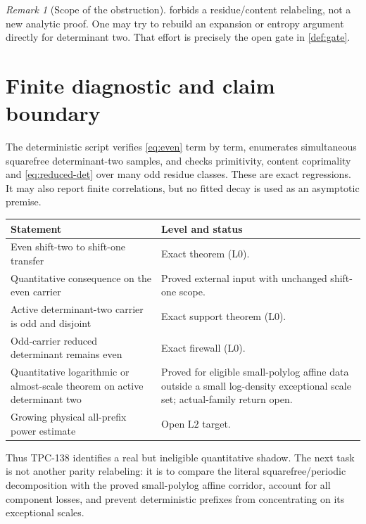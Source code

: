 \documentclass[11pt]{article}
\theoremstyle{definition}
\theoremstyle{remark}
\newtheorem{remark}[theorem]{Remark}
\newcommand{\Lzero}{\mathrm{L0}}
\newcommand{\Ltwo}{\mathrm{L2}}
\begin{document}
\begin{remark}[Scope of the obstruction]
 forbids a residue/content relabeling, not a new
analytic proof.  One may try to rebuild an expansion or entropy
argument directly for determinant two.  That effort is precisely
the open gate in \cref{def:gate}.
\end{remark}

\section{Finite diagnostic and claim boundary}

The deterministic script verifies \eqref{eq:even} term by term,
enumerates simultaneous squarefree determinant-two samples, and
checks primitivity, content coprimality and
\eqref{eq:reduced-det} over many odd residue classes.  These are
exact regressions.  It may also report finite correlations, but no
fitted decay is used as an asymptotic premise.

\begin{center}
\small
\begin{tabularx}{\textwidth}{@{}p{}X@{}}
\toprule
Statement & Level and status\\
\midrule
Even shift-two to shift-one transfer
& Exact theorem (\(\Lzero\)).\\
Quantitative consequence on the even carrier
& Proved external input with unchanged shift-one scope.\\
Active determinant-two carrier is odd and disjoint
& Exact support theorem (\(\Lzero\)).\\
Odd-carrier reduced determinant remains even
& Exact firewall (\(\Lzero\)).\\
Quantitative logarithmic or almost-scale theorem on active
determinant two
& Proved for eligible small-polylog affine data outside a
small log-density exceptional scale set; actual-family return
open.\\
Growing physical all-prefix power estimate
& Open \(\Ltwo\) target.\\
\bottomrule
\end{tabularx}
\end{center}

Thus TPC-138 identifies a real but ineligible quantitative shadow.
The next task is not another parity relabeling: it is to compare the
literal squarefree/periodic decomposition with the proved
small-polylog affine corridor, account for all component losses,
and prevent deterministic prefixes from concentrating on its
exceptional scales.

\begingroup
\footnotesize
\raggedright


\endgroup
\end{document}
